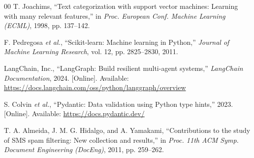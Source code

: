 \documentclass[conference]{IEEEtran}
\begin{document}
\begin{thebibliography}{00}
T. Joachims, ``Text categorization with support vector machines: Learning with many relevant features,'' in \emph{Proc. European Conf. Machine Learning (ECML)}, 1998, pp. 137--142.

F. Pedregosa \emph{et al.}, ``Scikit-learn: Machine learning in Python,'' \emph{Journal of Machine Learning Research}, vol. 12, pp. 2825--2830, 2011.

LangChain, Inc., ``LangGraph: Build resilient multi-agent systems,'' \emph{LangChain Documentation}, 2024. [Online]. Available: \url{https://docs.langchain.com/oss/python/langgraph/overview}

S. Colvin \emph{et al.}, ``Pydantic: Data validation using Python type hints,'' 2023. [Online]. Available: \url{https://docs.pydantic.dev/}

T. A. Almeida, J. M. G. Hidalgo, and A. Yamakami, ``Contributions to the study of SMS spam filtering: New collection and results,'' in \emph{Proc. 11th ACM Symp. Document Engineering (DocEng)}, 2011, pp. 259--262.

\end{thebibliography}
\end{document}
